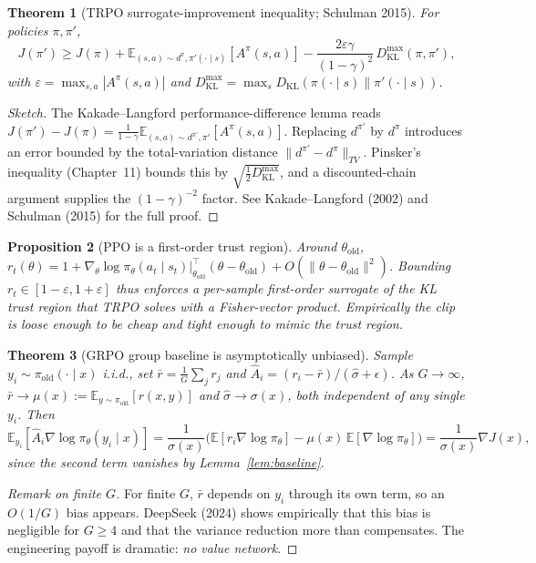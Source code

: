 \documentclass[11pt]{article}
\newtheorem{theorem}{Theorem}[section]
\newtheorem{proposition}[theorem]{Proposition}
\theoremstyle{remark}
\begin{document}
\begin{theorem}[TRPO surrogate-improvement inequality; Schulman 2015]
For policies $\pi,\pi'$,
\[
J(\pi')\geq J(\pi)+\mathbb{E}_{(s,a)\sim d^\pi,\pi'(\cdot\mid s)}\!\left[A^\pi(s,a)\right]-\frac{2\varepsilon\gamma}{(1-\gamma)^2}\,D_{\mathrm{KL}}^{\max}(\pi,\pi'),
\]
with $\varepsilon=\max_{s,a}|A^\pi(s,a)|$ and $D_{\mathrm{KL}}^{\max}=\max_s D_{\mathrm{KL}}(\pi(\cdot\mid s)\|\pi'(\cdot\mid s))$.
\end{theorem}

\begin{proof}[Sketch]
The Kakade--Langford performance-difference lemma reads $J(\pi')-J(\pi)=\frac{1}{1-\gamma}\mathbb{E}_{(s,a)\sim d^{\pi'},\pi'}[A^\pi(s,a)]$. Replacing $d^{\pi'}$ by $d^\pi$ introduces an error bounded by the total-variation distance $\|d^{\pi'}-d^\pi\|_{TV}$. Pinsker's inequality (Chapter~11) bounds this by $\sqrt{\tfrac12 D_{\mathrm{KL}}^{\max}}$, and a discounted-chain argument supplies the $(1-\gamma)^{-2}$ factor. See Kakade--Langford (2002) and Schulman (2015) for the full proof.
\end{proof}

\begin{proposition}[PPO is a first-order trust region]
Around $\theta_{\mathrm{old}}$, $r_t(\theta)=1+\nabla_\theta\log\pi_\theta(a_t\mid s_t)\big|_{\theta_{\mathrm{old}}}^{\top}(\theta-\theta_{\mathrm{old}})+O(\|\theta-\theta_{\mathrm{old}}\|^2)$. Bounding $r_t\in[1-\varepsilon,1+\varepsilon]$ thus enforces a per-sample first-order surrogate of the KL trust region that TRPO solves with a Fisher-vector product. Empirically the clip is loose enough to be cheap and tight enough to mimic the trust region.
\end{proposition}

\begin{theorem}[GRPO group baseline is asymptotically unbiased]
Sample $y_i\sim\pi_{\mathrm{old}}(\cdot\mid x)$ i.i.d., set $\bar r=\tfrac{1}{G}\sum_j r_j$ and $\hat A_i=(r_i-\bar r)/(\hat\sigma+\epsilon)$. As $G\to\infty$, $\bar r\to\mu(x):=\mathbb{E}_{y\sim\pi_{\mathrm{old}}}[r(x,y)]$ and $\hat\sigma\to\sigma(x)$, both independent of any single $y_i$. Then
\[
\mathbb{E}_{y_i}[\hat A_i\nabla\log\pi_\theta(y_i\mid x)] = \frac{1}{\sigma(x)}\bigl(\mathbb{E}[r_i\nabla\log\pi_\theta]-\mu(x)\,\mathbb{E}[\nabla\log\pi_\theta]\bigr) = \frac{1}{\sigma(x)}\nabla J(x),
\]
since the second term vanishes by Lemma~\ref{lem:baseline}.
\end{theorem}

\begin{proof}[Remark on finite $G$]
For finite $G$, $\bar r$ depends on $y_i$ through its own term, so an $O(1/G)$ bias appears. DeepSeek (2024) shows empirically that this bias is negligible for $G\geq 4$ and that the variance reduction more than compensates. The engineering payoff is dramatic: \emph{no value network}.
\end{proof}
\end{document}
